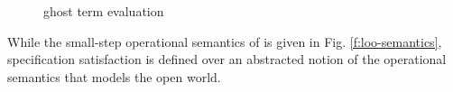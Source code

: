 \begin{figure}[hbp]
\begin{minipage}{\textwidth}
\footnotesize{
}
\caption{\LangOO ghost term evaluation}
\label{f:evaluation}
\end{minipage}
\end{figure}

While the small-step operational semantics of \LangOO is given in Fig. \ref{f:loo-semantics},
specification satisfaction is defined over an abstracted notion of 
the operational semantics that models the open world. %




